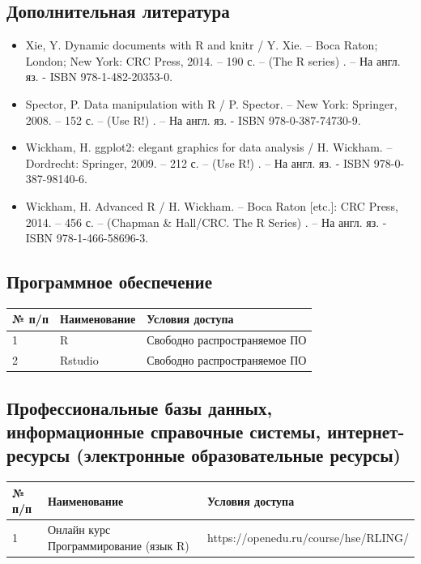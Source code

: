 \documentclass[a4paper]{article}
\begin{document}
\subsection{Дополнительная литература}
\begin{itemize}
\item   Xie, Y. Dynamic documents with R and knitr / Y. Xie. – Boca Raton; London; New York: CRC Press, 2014. – 190 с. – (The R series) . – На англ. яз. - ISBN 978-1-482-20353-0. 
\item Spector, P.  Data manipulation with R / P. Spector. – New York: Springer, 2008. – 152 с. – (Use R!) . – На англ. яз. - ISBN 978-0-387-74730-9. 
\item   Wickham, H. ggplot2: elegant graphics for data analysis / H. Wickham. – Dordrecht: Springer, 2009. – 212 с. – (Use R!) . – На англ. яз. - ISBN 978-0-387-98140-6. 
\item   Wickham, H. Advanced R / H. Wickham. – Boca Raton [etc.]: CRC Press, 2014. – 456 с. – (Chapman \& Hall/CRC. The R Series) . – На англ. яз. - ISBN 978-1-466-58696-3. 
\end{itemize}
\subsection{Программное обеспечение}
\begin{tabular}{|l|l|l|}
\hline
№ п/п &	Наименование	& Условия доступа \\ \hline
1	& R &	Свободно распространяемое ПО \\ \hline
2	& Rstudio &	Свободно распространяемое ПО \\ \hline
\end{tabular}
\subsection{Профессиональные базы данных, информационные справочные системы, интернет-ресурсы (электронные образовательные ресурсы)}

\begin{tabular}{|l|l|l|}
\hline
№ п/п &	Наименование	& Условия доступа \\ \hline
1	& Онлайн курс Программирование (язык R) &	https://openedu.ru/course/hse/RLING/ \\ \hline
\end{tabular}
\end{document}
